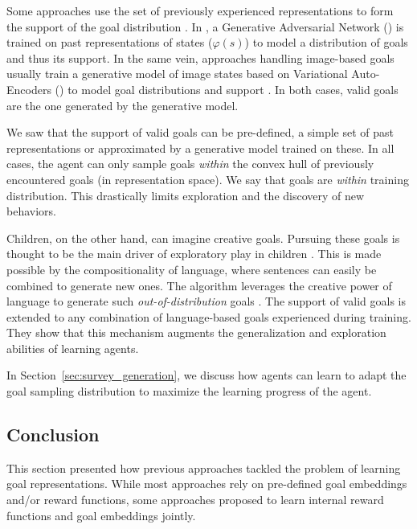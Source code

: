 Some approaches use the set of previously experienced representations to form the support of the goal distribution \cite{veeriah2018many,akakzia2020decstr,ecoffet2020first}. In \cite{goalgan}, a Generative Adversarial Network (\gan) is trained on past representations of states ($\varphi(s)$) to model a distribution of goals and thus its support. In the same vein, approaches handling image-based goals usually train a generative model of image states based on Variational Auto-Encoders (\vae) to model goal distributions and support \cite{nair2018visual,pong2019skew,nair2020contextual}. In both cases, valid goals are the one generated by the generative model.

We saw that the support of valid goals can be pre-defined, a simple set of past representations or approximated by a generative model trained on these. In all cases, the agent can only sample goals \textit{within} the convex hull of previously encountered goals (in representation space). We say that goals are \textit{within} training distribution. This drastically limits exploration and the discovery of new behaviors.

Children, on the other hand, can imagine creative goals. Pursuing these goals is thought to be the main driver of exploratory play in children \cite{chu2020exploratory}. This is made possible by the compositionality of language, where sentences can easily be combined to generate new ones. The \imagine algorithm leverages the creative power of language to generate such \textit{out-of-distribution} goals \cite{imagine}. The support of valid goals is extended to any combination of language-based goals experienced during training. They show that this mechanism augments the generalization and exploration abilities of learning agents.

In Section~\ref{sec:survey_generation}, we discuss how agents can learn to adapt the goal sampling distribution
to maximize the learning progress of the agent.

\subsection{Conclusion}
This section presented how previous approaches tackled the problem of learning goal representations. While most approaches rely on pre-defined goal embeddings and/or reward functions, some approaches proposed to learn internal reward functions and goal embeddings jointly.



